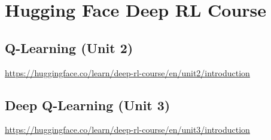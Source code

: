\documentclass[11pt,notitlepage]{report}
\theoremstyle{definition}
\theoremstyle{plain}
\begin{document}
\chapter{Hugging Face Deep RL Course}\label{chap:huggingface}

\section{Q-Learning (Unit 2)}
\url{https://huggingface.co/learn/deep-rl-course/en/unit2/introduction}


\section{Deep Q-Learning (Unit 3)}
\url{https://huggingface.co/learn/deep-rl-course/en/unit3/introduction}

\end{document}

